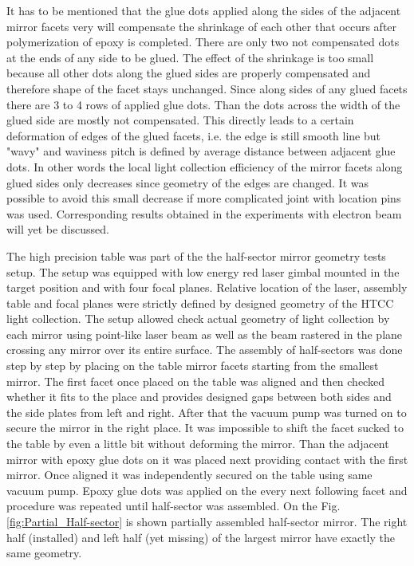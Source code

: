 It has to be mentioned that the glue dots applied along the sides of the adjacent mirror facets very will compensate the shrinkage of each other that occurs after polymerization of epoxy is completed. There are only two not compensated dots at the ends of any side to be glued. The effect of the shrinkage is too small because all other dots along the glued sides are properly compensated and therefore shape of the facet stays unchanged. Since along sides of any glued facets there are 3 to 4 rows of applied glue dots. Than the dots across the width of the glued side are mostly not compensated. This directly leads to a certain deformation of edges of the glued facets, i.e. the edge is still smooth line  but "wavy" and waviness pitch is defined by average distance between adjacent glue dots. In other words the local light collection efficiency of the mirror facets along glued sides only decreases since geometry of the edges are changed. It was possible to avoid this small decrease if more complicated joint with location pins was used. Corresponding results obtained in the experiments with electron beam will yet be discussed.

The high precision table was part of the the half-sector mirror geometry tests setup. The setup was equipped with low energy red laser gimbal mounted in the target position and with four focal planes. Relative location of the laser, assembly table and focal planes were strictly defined by designed geometry of the HTCC light collection. The setup allowed check actual geometry of light collection by each mirror using point-like laser beam as well as the beam rastered in the plane crossing any mirror over its entire surface. The assembly of half-sectors was done step by step by placing on the table mirror facets starting from the smallest mirror. The first facet once placed on the table was aligned and then checked whether it fits to the place and provides designed gaps between both sides and the side plates from left and right. After that the vacuum pump was turned on to secure the mirror in the right place. It was impossible to shift the facet sucked to the table by even a little bit without deforming the mirror. Than the adjacent mirror with epoxy glue dots on it was placed next providing contact with the first mirror. Once aligned it was independently secured on the table using same vacuum pump. Epoxy glue dots was applied on the every next following facet and procedure was repeated until half-sector was assembled. On the Fig.\ref{fig:Partial_Half-sector} is shown partially assembled half-sector mirror. The right half (installed) and left half (yet missing) of the largest mirror have exactly the same geometry. 

